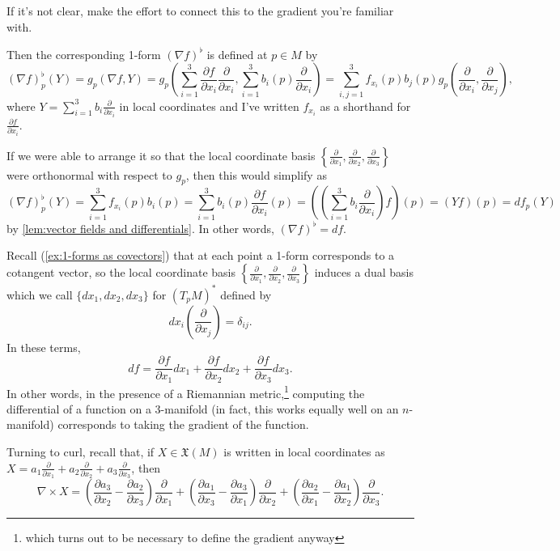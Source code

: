 \begin{exercise}
	If it's not clear, make the effort to connect this to the gradient you're familiar with.
\end{exercise}

Then the corresponding 1-form $(\nabla f)^\flat$ is defined at $p \in M$ by
\[
	(\nabla f)_p^\flat(Y) = g_p(\nabla f, Y) = g_p\left(\sum_{i=1}^3 \frac{\partial f}{\partial x_i} \frac{\partial}{\partial x_i}, \sum_{i=1}^3 b_i(p) \frac{\partial }{\partial x_i}\right) = \sum_{i,j=1}^3 f_{x_i}(p) b_j(p) g_p\left(\frac{\partial }{\partial x_i}, \frac{\partial }{\partial x_j}\right),
\]
where $Y = \sum_{i=1}^3 b_i \frac{\partial }{\partial x_i}$ in local coordinates and I've written $f_{x_i}$ as a shorthand for $\frac{\partial f}{\partial x_i}$.

If we were able to arrange it so that the local coordinate basis $\left\{ \frac{\partial }{\partial x_1},\frac{\partial }{\partial x_2},\frac{\partial }{\partial x_3}\right\}$ were orthonormal with respect to $g_p$, then this would simplify as
\[
	(\nabla f)_p^\flat(Y) = \sum_{i=1}^3 f_{x_i}(p) b_i(p) = \sum_{i=1}^3  b_i(p) \frac{\partial f}{\partial x_i}(p) = \left(\left(\sum_{i=1}^3  b_i \frac{\partial}{\partial x_i}\right)f\right)(p) = (Yf)(p) = df_p(Y)
\]
by \cref{lem:vector fields and differentials}. In other words, $(\nabla f)^\flat = df$.

Recall (\cref{ex:1-forms as covectors}) that at each point a 1-form corresponds to a cotangent vector, so the local coordinate basis $\left\{ \frac{\partial }{\partial x_1},\frac{\partial }{\partial x_2},\frac{\partial }{\partial x_3}\right\}$ induces a dual basis which we call $\{dx_1, dx_2, dx_3\}$ for $\left(T_pM\right)^\ast$ defined by 
\[
	dx_i\left(\frac{\partial}{\partial x_j}\right) = \delta_{ij}.
\]
In these terms, 
\[
	df = \frac{\partial f}{\partial x_1} dx_1 + \frac{\partial f}{\partial x_2} dx_2 + \frac{\partial f}{\partial x_3}dx_3.
\]
In other words, in the presence of a Riemannian metric,\footnote{which turns out to be necessary to define the gradient anyway} computing the differential of a function on a 3-manifold (in fact, this works equally well on an $n$-manifold) corresponds to taking the gradient of the function.

Turning to curl, recall that, if $X \in \mathfrak{X}(M)$ is written in local coordinates as $X = a_1 \frac{\partial }{\partial x_1} + a_2 \frac{\partial }{\partial x_2} + a_3 \frac{\partial }{\partial x_3}$, then
\[
	\nabla \times X = \left(\frac{\partial a_3}{\partial x_2} - \frac{\partial a_2}{\partial x_3} \right)\frac{\partial }{\partial x_1} + \left( \frac{\partial a_1}{\partial x_3} - \frac{\partial a_3}{\partial x_1} \right) \frac{\partial }{\partial x_2} + \left( \frac{\partial a_2}{\partial x_1} - \frac{\partial a_1}{\partial x_2} \right) \frac{\partial }{\partial x_3}.
\]


